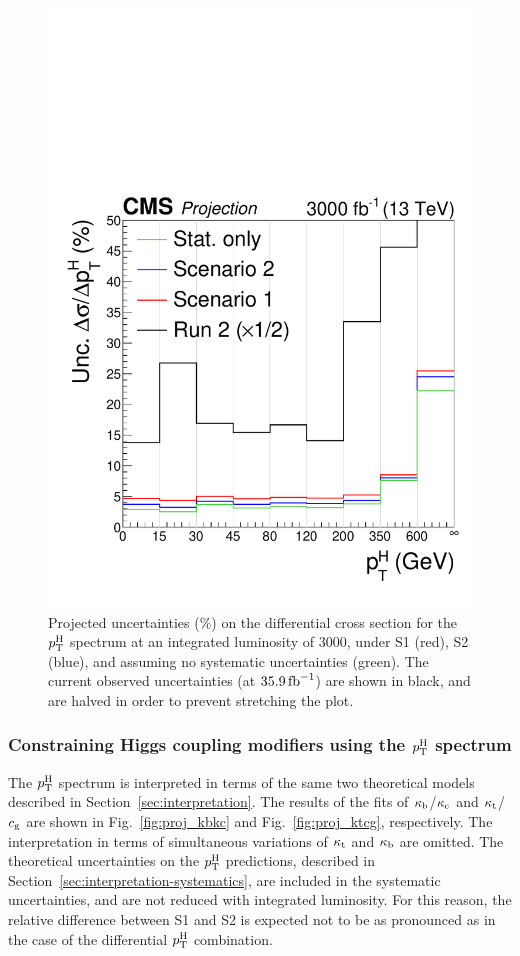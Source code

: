\begin{figure}[hbtp]
  \begin{center}
    \includegraphics[width=0.49\linewidth]{img/projections/hllhc-pth-unc-scenarios.pdf}
    \caption{
        Projected uncertainties (\%) on the differential cross section for the $p_\mathrm{T}^\mathrm{H}$ spectrum at an integrated luminosity of 3000\fbinv, under S1 (red), S2 (blue), and assuming no systematic uncertainties (green).
        The current observed uncertainties (at $35.9\,\text{fb}^{-1}$) are shown in black, and are halved in order to prevent stretching the plot.
        }
    \label{fig:hllhc-pth-unc-scenarios}
  \end{center}
\end{figure}


\subsubsection{Constraining Higgs coupling modifiers using the \texorpdfstring{$p_\mathrm{T}^\mathrm{H}$}{pTH} spectrum}

The $p_\mathrm{T}^\mathrm{H}$ spectrum is interpreted in terms of the same two theoretical models described in Section~\ref{sec:interpretation}.
% 
The results of the fits of $\kappa_{\mathrm{b}}$/$\kappa_{\mathrm{c}}$ and $\kappa_{\mathrm{t}}$/$c_\mathrm{g}$ are shown in Fig.~\ref{fig:proj_kbkc} and Fig.~\ref{fig:proj_ktcg}, respectively.
% 
The interpretation in terms of simultaneous variations of $\kappa_{\mathrm{t}}$ and $\kappa_{\mathrm{b}}$ are omitted.
% 
The theoretical uncertainties on the $p_\mathrm{T}^\mathrm{H}$ predictions, described in Section~\ref{sec:interpretation-systematics}, are included in the systematic uncertainties, and are not reduced with integrated luminosity.
% 
For this reason, the relative difference between S1 and S2 is expected not to be as pronounced as in the case of the differential $p_\mathrm{T}^\mathrm{H}$ combination.
% 


